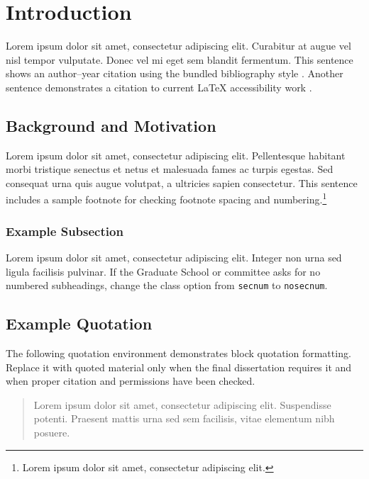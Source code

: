 \documentclass[doctoral,fulldocument,secnum,pdfonly,boundcover]{uofm}
\begin{document}
\mainmatter

\chapter{Introduction}

Lorem ipsum dolor sit amet, consectetur adipiscing elit. Curabitur at augue vel
nisl tempor vulputate. Donec vel mi eget sem blandit fermentum. This sentence
shows an author--year citation using the bundled bibliography style
\citep{uomGuide2025}. Another sentence demonstrates a citation to current
LaTeX accessibility work \citep{latexTaggingProject}.

\section{Background and Motivation}

Lorem ipsum dolor sit amet, consectetur adipiscing elit. Pellentesque habitant
morbi tristique senectus et netus et malesuada fames ac turpis egestas. Sed
consequat urna quis augue volutpat, a ultricies sapien consectetur. This
sentence includes a sample footnote for checking footnote spacing and numbering.\footnote{Lorem ipsum dolor sit amet, consectetur adipiscing elit.}

\subsection{Example Subsection}

Lorem ipsum dolor sit amet, consectetur adipiscing elit. Integer non urna sed
ligula facilisis pulvinar. If the Graduate School or committee asks for no
numbered subheadings, change the class option from \texttt{secnum} to
\texttt{nosecnum}.

\section{Example Quotation}

The following quotation environment demonstrates block quotation formatting.
Replace it with quoted material only when the final dissertation requires it and
when proper citation and permissions have been checked.

\begin{quote}
Lorem ipsum dolor sit amet, consectetur adipiscing elit. Suspendisse potenti.
Praesent mattis urna sed sem facilisis, vitae elementum nibh posuere.
\end{quote}
\end{document}

